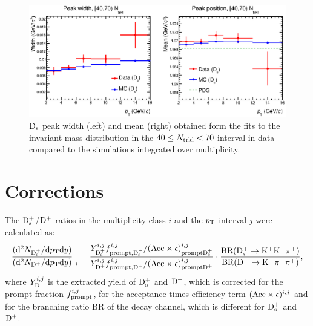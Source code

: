 \begin{figure}[htpb]
\centering
 \includegraphics[width=1\textwidth]{FigCap6/DsMeanSigma_DataMC_4070_Ntrkl.eps}
  \caption{${\rm D_s}$ peak width (left) and mean (right) obtained form the fits to the invariant mass distribution in the $40 \leq N_{\rm trkl} < 70$ interval in data compared to the simulations integrated over multiplicity.}
 \label{fig:DsFitParamsVsNtrkl}
\end{figure}

\section{Corrections}
\label{sec:Corrections}
The ${\rm D_s^+}$/${\rm D^+}$ ratios in the multiplicity class $i$ and the $p_{\rm T}$ interval $j$ were calculated
as:
\begin{equation} 
\label{eq:NtrklCorr}
 \frac{({\rm d}^2N_{{\rm D_s^+}}/{\rm d}p_{\rm T} {\rm d}y)}{({\rm d}^2N_{{\rm D^+}}/{\rm d}p_{\rm T} {\rm d}y)} \Big |_i = \frac{Y^{i, j}_{{\rm D_s^+}}  f^{i, j}_{\rm prompt, {\rm D_s^+}} / ({\rm Acc} \times \epsilon)^{i, j}_{\rm prompt {\rm D_s^+}}}{Y^{i, j}_{{\rm D^+}}  f^{i, j}_{\rm prompt, {\rm D^+}} / ({\rm Acc} \times \epsilon)^{i, j}_{\rm prompt {\rm D^+}}} \cdot \frac{\rm BR({\rm D^{+}_\mathrm{s}\to K^+ K^-\pi^+})}{\rm BR({\rm D}^+\to {\rm K}^-\pi^+\pi^+)},
\end{equation}
where $Y^{i, j}_{\rm D}$ is the extracted yield of ${\rm D_s^+}$ and ${\rm D^+}$, which is corrected for the prompt fraction
$f^{i, j}_{\rm prompt}$, for the acceptance-times-efficiency term $({\rm Acc} \times \epsilon)^{i, j}$ and for
the branching ratio BR of the decay channel, which is different for ${\rm D_s^+}$ and ${\rm D^+}$.\\



